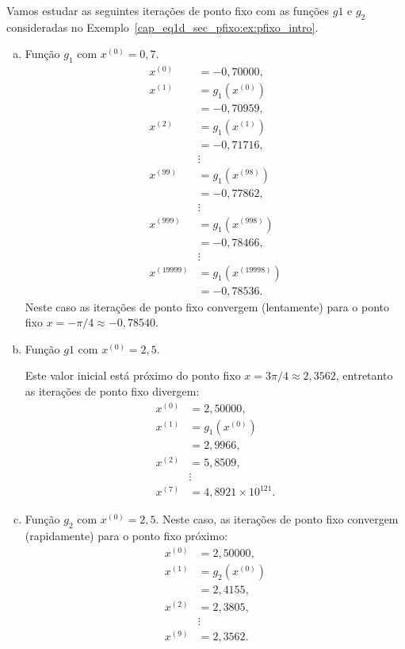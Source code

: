 \begin{ex}
  Vamos estudar as seguintes iterações de ponto fixo com as funções $g1$ e $g_2$ consideradas no Exemplo~\ref{cap_eq1d_sec_pfixo:ex:pfixo_intro}.
  \begin{enumerate}[a)]
  \item Função $g_1$ com $x^{(0)} = 0,7$.
    \begin{align}
      x^{(0)} &= -0,70000,\\
      x^{(1)} &= g_1\left(x^{(0)}\right)\\
              &= -0,70959,\\
      x^{(2)} &= g_1\left(x^{(1)}\right)\\
              &=-0,71716,\\
              &\vdots \nonumber\\
      x^{(99)} &= g_1\left(x^{(98)}\right)\\
              &= -0,77862,\\
              &\vdots \nonumber\\
      x^{(999)} &= g_1\left(x^{(998)}\right)\\
              &= -0,78466,\\    
              &\vdots \nonumber\\
      x^{(19999)} &= g_1\left(x^{(19998)}\right)\\
              &= -0,78536.
    \end{align}
    Neste caso as iterações de ponto fixo convergem (lentamente) para o ponto fixo $x=-\pi/4\approx -0,78540$.

  \item Função $g1$ com $x^{(0)} = 2,5$.
    
    Este valor inicial está próximo do ponto fixo $x=3\pi/4\approx 2,3562$, entretanto as iterações de ponto fixo divergem:
    \begin{align}
      x^{(0)} &= 2,50000,\\
      x^{(1)} &= g_1\left(x^{(0)}\right)\\
              &= 2,9966,\\
      x^{(2)} &= 5,8509,\\
              &\vdots \nonumber\\
      x^{(7)} &= 4,8921\times 10^{121}.
    \end{align}
    
  \item Função $g_2$ com $x^{(0)} = 2,5$.
    Neste caso, as iterações de ponto fixo convergem (rapidamente) para o ponto fixo próximo:
    \begin{align}
      x^{(0)} &= 2,50000,\\
      x^{(1)} &= g_2\left(x^{(0)}\right)\\
              &= 2,4155,\\
      x^{(2)} &= 2,3805,\\
              &\vdots \\
      x^{(9)} &= 2,3562.
    \end{align}    
  \end{enumerate}
\end{ex}

